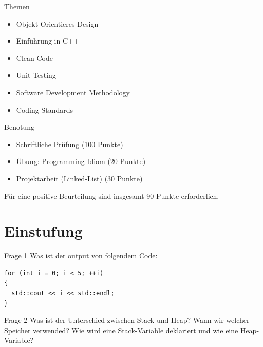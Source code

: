 \documentclass{beamer}
\begin{document}
\begin{frame}{Themen}
\begin{itemize}
  \item Objekt-Orientieres Design
  \item Einführung in C++
  \item Clean Code
  \item Unit Testing
  \item Software Development Methodology
  \item Coding Standards
\end{itemize}
\end{frame}

\begin{frame}{Benotung}
\begin{itemize}
  \item Schriftliche Prüfung (100 Punkte)
  \item Übung: Programming Idiom (20 Punkte)
  \item Projektarbeit (Linked-List) (30 Punkte)
\end{itemize}
Für eine positive Beurteilung sind insgesamt 90 Punkte erforderlich.
\end{frame}


\section{Einstufung}
\begin{frame}[fragile]{Frage 1}
Was ist der output von folgendem Code:
\begin{lstlisting}
for (int i = 0; i < 5; ++i)
{
  std::cout << i << std::endl;
}
\end{lstlisting}
\end{frame}

\begin{frame}{Frage 2}
Was ist der Unterschied zwischen Stack und Heap? Wann wir welcher Speicher
verwended? Wie wird eine Stack-Variable deklariert und wie eine Heap-Variable?
\end{frame}
\end{document}

